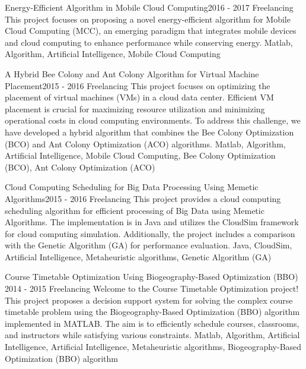 \begin{projects}
	\project
	{Energy-Efficient Algorithm in Mobile Cloud Computing}{2016 - 2017}
	{ {Freelancing} }
	{This project focuses on proposing a novel energy-efficient algorithm for Mobile Cloud Computing (MCC), an emerging paradigm that integrates mobile devices and cloud computing to enhance performance while conserving energy.}
	{Matlab, Algorithm, Artificial Intelligence, Mobile Cloud Computing}
	
	\project
	{A Hybrid Bee Colony and Ant Colony Algorithm for Virtual Machine Placement}{2015 - 2016}
	{ {Freelancing} }
	{This project focuses on optimizing the placement of virtual machines (VMs) in a cloud data center. Efficient VM placement is crucial for maximizing resource utilization and minimizing operational costs in cloud computing environments. To address this challenge, we have developed a hybrid algorithm that combines the Bee Colony Optimization (BCO) and Ant Colony Optimization (ACO) algorithms.}
	{Matlab, Algorithm, Artificial Intelligence, Mobile Cloud Computing, Bee Colony Optimization (BCO), Ant Colony Optimization (ACO)}

	\project
	{Cloud Computing Scheduling for Big Data Processing Using Memetic Algorithms}{2015 - 2016}
	{ {Freelancing} }
	{This project provides a cloud computing scheduling algorithm for efficient processing of Big Data using Memetic Algorithms. The implementation is in Java and utilizes the CloudSim framework for cloud computing simulation. Additionally, the project includes a comparison with the Genetic Algorithm (GA) for performance evaluation.}
	{Java, CloudSim, Artificial Intelligence, Metaheuristic algorithms, Genetic Algorithm (GA)}

	\project
	{Course Timetable Optimization Using Biogeography-Based Optimization (BBO) }{2014 - 2015}
	{ {Freelancing} }
	{Welcome to the Course Timetable Optimization project! This project proposes a decision support system for solving the complex course timetable problem using the Biogeography-Based Optimization (BBO) algorithm implemented in MATLAB. The aim is to efficiently schedule courses, classrooms, and instructors while satisfying various constraints.}
	{Matlab, Algorithm, Artificial Intelligence, Artificial Intelligence, Metaheuristic algorithms, Biogeography-Based Optimization (BBO) algorithm}

\end{projects}